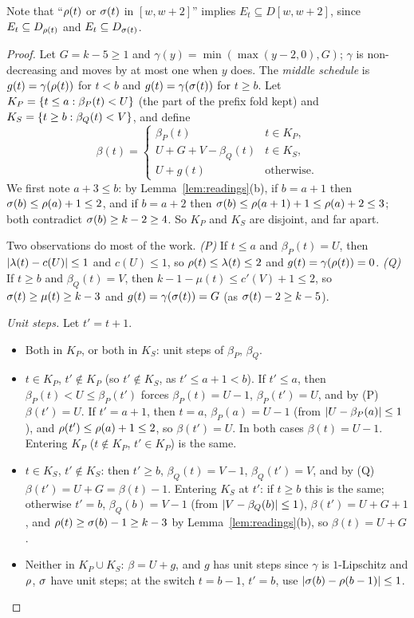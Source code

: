 Note that ``$\rho(t)$ or $\sigma(t)$ in $[w,w+2]$'' implies $E_t\subseteq D[w,w+2]$, since $E_t\subseteq D_{\rho(t)}$ and $E_t\subseteq
D_{\sigma(t)}$.

\begin{proof}
Let $G=k-5\ge1$ and $\gamma(y)=\min(\max(y-2,0),G)$; $\gamma$ is non-decreasing and moves by at most one when $y$ does. The \emph{middle
schedule} is $g(t)=\gamma(\rho(t))$ for $t<b$ and $g(t)=\gamma(\sigma(t))$ for $t\ge b$. Let $K_P=\left\{ t\le a:\beta_P(t)<U \right\}$ (the part of the
prefix fold kept) and $K_S=\left\{ t\ge b:\beta_Q(t)<V \right\}$, and define
\[
\beta(t)=\begin{cases}\beta_P(t)&t\in K_P,\\ U+G+V-\beta_Q(t)&t\in K_S,\\ U+g(t)&\text{otherwise.}\end{cases}
\]
We first note $a+3\le b$: by Lemma~\ref{lem:readings}(b), if $b=a+1$ then $\sigma(b)\le\rho(a)+1\le2$, and if $b=a+2$ then $\sigma(b)\le\rho(a+1)+1
\le\rho(a)+2\le3$; both contradict $\sigma(b)\ge k-2\ge4$. So $K_P$ and $K_S$ are disjoint, and far apart.

Two observations do most of the work. \emph{(P)} If $t\le a$ and $\beta_P(t)=U$, then $\left\lvert \lambda(t)-c(U)\right\rvert\le1$ and $c(U)\le1$, so
$\rho(t)\le\lambda(t)\le2$ and $g(t)=\gamma(\rho(t))=0$. \emph{(Q)} If $t\ge b$ and $\beta_Q(t)=V$, then $k-1-\mu(t)\le c'(V)+1\le2$, so
$\sigma(t)\ge\mu(t)\ge k-3$ and $g(t)=\gamma(\sigma(t))=G$ (as $\sigma(t)-2\ge k-5$).

\emph{Unit steps.} Let $t'=t+1$.
\begin{itemize}
\item Both in $K_P$, or both in $K_S$: unit steps of $\beta_P$, $\beta_Q$.
\item $t\in K_P$, $t'\notin K_P$ (so $t'\notin K_S$, as $t'\le a+1<b$). If $t'\le a$, then $\beta_P(t)<U\le\beta_P(t')$ forces $\beta_P(t)=U-1$,
$\beta_P(t')=U$, and by (P) $\beta(t')=U$. If $t'=a+1$, then $t=a$, $\beta_P(a)=U-1$ (from $\left\lvert U-\beta_P(a)\right\rvert\le1$), and
$\rho(t')\le\rho(a)+1\le2$, so $\beta(t')=U$. In both cases $\beta(t)=U-1$. Entering $K_P$ ($t\notin K_P$, $t'\in K_P$) is the same.
\item $t\in K_S$, $t'\notin K_S$: then $t'\ge b$, $\beta_Q(t)=V-1$, $\beta_Q(t')=V$, and by (Q) $\beta(t')=U+G=\beta(t)-1$. Entering $K_S$ at
$t'$: if $t\ge b$ this is the same; otherwise $t'=b$, $\beta_Q(b)=V-1$ (from $\left\lvert V-\beta_Q(b)\right\rvert\le1$), $\beta(t')=U+G+1$, and
$\rho(t)\ge\sigma(b)-1\ge k-3$ by Lemma~\ref{lem:readings}(b), so $\beta(t)=U+G$.
\item Neither in $K_P\cup K_S$: $\beta=U+g$, and $g$ has unit steps since $\gamma$ is $1$-Lipschitz and $\rho$, $\sigma$ have unit steps;
at the switch $t=b-1$, $t'=b$, use $\left\lvert \sigma(b)-\rho(b-1)\right\rvert\le1$.
\end{itemize}


\end{proof}
